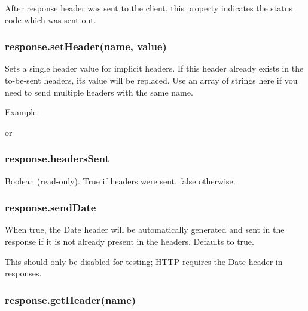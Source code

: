 After response header was sent to the client, this property indicates
the status code which was sent out.

\subsubsection{response.setHeader(name, value)}

Sets a single header value for implicit headers. If this header already
exists in the to-be-sent headers, its value will be replaced. Use an
array of strings here if you need to send multiple headers with the same
name.

Example:

\begin{Shaded}
\begin{Highlighting}[]
\NormalTok{(}\NormalTok{, }\NormalTok{);}
\end{Highlighting}
\end{Shaded}

or

\begin{Shaded}
\begin{Highlighting}[]
\NormalTok{(}\NormalTok{, [}\NormalTok{, }\NormalTok{]);}
\end{Highlighting}
\end{Shaded}

\subsubsection{response.headersSent}

Boolean (read-only). True if headers were sent, false otherwise.

\subsubsection{response.sendDate}

When true, the Date header will be automatically generated and sent in
the response if it is not already present in the headers. Defaults to
true.

This should only be disabled for testing; HTTP requires the Date header
in responses.

\subsubsection{response.getHeader(name)}

